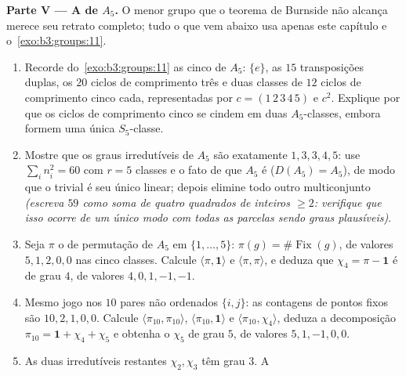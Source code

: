 \begin{problem}
\medskip
\noindent\textbf{Parte V --- A  de $A_5$.} O
menor grupo que o teorema de Burnside não alcança merece seu retrato
completo; tudo o que vem abaixo usa apenas este capítulo e o~\cref{exo:b3:groups:11}.
\begin{enumerate}[resume]
  \item Recorde do~\cref{exo:b3:groups:11} as cinco  de
        $A_5$: $\{e\}$, as $15$ transposições duplas, os
        $20$ ciclos de comprimento três e duas classes de $12$
        ciclos de comprimento cinco cada, representadas por $c =
        (1\,2\,3\,4\,5)$ e
        $c^2$. Explique por que os ciclos de comprimento cinco se
        cindem em duas $A_5$-classes, embora formem uma única
        $S_5$-classe.
  \item Mostre que os graus irredutíveis de $A_5$ são exatamente
        $1, 3, 3, 4, 5$: use $\sum_in_i^2 = 60$ com $r = 5$ classes e o fato de que
        $A_5$ é  ($D(A_5) =
        A_5$), de modo que o  trivial é
        seu único  linear; depois elimine todo outro
        multiconjunto \emph{(escreva $59$ como soma de quatro
        quadrados de inteiros $\geq 2$: verifique que isso ocorre de
        um único modo com todas as parcelas sendo graus plausíveis)}.
  \item Seja $\pi$ o  de permutação de $A_5$ em $\{1, \dots, 5\}$:
        $\pi(g) = \#\operatorname{Fix}(g)$, de valores $5, 1, 2, 0, 0$ nas cinco classes. Calcule $\langle\pi, \mathbf 1\rangle$ e
        $\langle\pi,
        \pi\rangle$, e deduza que $\chi_4 = \pi - \mathbf 1$ é  de grau $4$, de
        valores $4, 0, 1, -1,
        -1$.
  \item Mesmo jogo nos $10$ pares não ordenados $\{i, j\}$: as contagens
        de pontos fixos são $10, 2, 1, 0, 0$. Calcule $\langle\pi_{10}, \pi_{10}\rangle$, $\langle\pi_{10},
        \mathbf 1\rangle$ e $\langle\pi_{10}, \chi_4\rangle$, deduza
        a decomposição $\pi_{10} = \mathbf 1 + \chi_4
        + \chi_5$ e obtenha o  
        $\chi_5$ de grau $5$, de valores $5, 1, -1, 0, 0$.
  \item As duas irredutíveis restantes $\chi_2, \chi_3$ têm grau $3$. A

\end{enumerate}
\end{problem}

